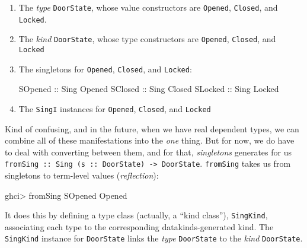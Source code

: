\documentclass[]{article}
\newenvironment{Shaded}{}{}
\newcommand{\DataTypeTok}[1]{\textcolor[rgb]{0.56,0.13,0.00}{#1}}
\newcommand{\NormalTok}[1]{#1}
\newcommand{\OperatorTok}[1]{\textcolor[rgb]{0.40,0.40,0.40}{#1}}
\newcommand{\OtherTok}[1]{\textcolor[rgb]{0.00,0.44,0.13}{#1}}
\begin{document}
\begin{enumerate}
\def\labelenumi{\arabic{enumi}.}
\item
  The \emph{type} \texttt{DoorState}, whose value constructors are
  \texttt{Opened}, \texttt{Closed}, and \texttt{Locked}.
\item
  The \emph{kind} \texttt{DoorState}, whose type constructors are
  \texttt{\textquotesingle{}Opened}, \texttt{\textquotesingle{}Closed}, and
  \texttt{\textquotesingle{}Locked}
\item
  The singletons for \texttt{\textquotesingle{}Opened},
  \texttt{\textquotesingle{}Closed}, and \texttt{\textquotesingle{}Locked}:

\begin{Shaded}
\begin{Highlighting}[]
\DataTypeTok{SOpened}\OtherTok{ ::} \DataTypeTok{Sing} \DataTypeTok{\textquotesingle{}Opened}
\DataTypeTok{SClosed}\OtherTok{ ::} \DataTypeTok{Sing} \DataTypeTok{\textquotesingle{}Closed}
\DataTypeTok{SLocked}\OtherTok{ ::} \DataTypeTok{Sing} \DataTypeTok{\textquotesingle{}Locked}
\end{Highlighting}
\end{Shaded}
\item
  The \texttt{SingI} instances for \texttt{\textquotesingle{}Opened},
  \texttt{\textquotesingle{}Closed}, and
  \texttt{\textquotesingle{}Locked\textquotesingle{}}
\end{enumerate}

Kind of confusing, and in the future, when we have real dependent types, we can
combine all of these manifestations into the \emph{one} thing. But for now, we
do have to deal with converting between them, and for that, \emph{singletons}
generates for us
\texttt{fromSing\ ::\ Sing\ (s\ ::\ DoorState)\ -\textgreater{}\ DoorState}.
\texttt{fromSing} takes us from singletons to term-level values
(\emph{reflection}):

\begin{Shaded}
\begin{Highlighting}[]
\NormalTok{ghci}\OperatorTok{>}\NormalTok{ fromSing }\DataTypeTok{SOpened}
\DataTypeTok{Opened}
\end{Highlighting}
\end{Shaded}

It does this by defining a type class (actually, a ``kind class''),
\texttt{SingKind}, associating each type to the corresponding
datakinds-generated kind. The \texttt{SingKind} instance for \texttt{DoorState}
links the \emph{type} \texttt{DoorState} to the \emph{kind} \texttt{DoorState}.
\end{document}
